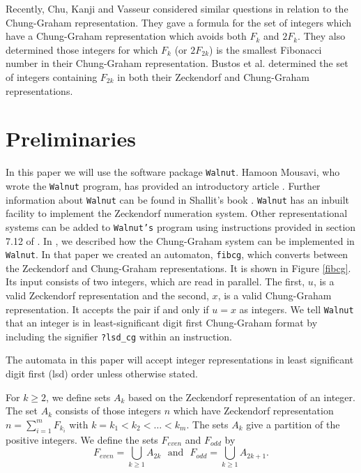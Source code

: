 \documentclass[12pt]{article}
\theoremstyle{plain}
\theoremstyle{case}
\theoremstyle{definition}
\begin{document}
Recently, Chu, Kanji and Vasseur considered similar questions in relation to the Chung-Graham representation.\cite{Chu:2025aa} They gave a formula for the set of integers which have a Chung-Graham representation which avoids both $F_k$ and $2 F_k$. They also determined those integers for which $F_k$ (or $2 F_{2k}$) is the smallest Fibonacci number in their Chung-Graham representation. Bustos et al.\cite{Bustos:2025aa} determined the set of integers containing $F_{2k}$ in both their Zeckendorf and Chung-Graham representations.

\bigskip

\section{Preliminaries}

In this paper we will use the software package {\tt Walnut}. Hamoon Mousavi, who wrote the  {\tt Walnut} program, has provided an introductory article \cite{Mousavi:2016aa}. Further information about {\tt Walnut} can be found in Shallit's book \cite{Shallit:2022}.  {\tt Walnut} has an inbuilt facility to implement the Zeckendorf  numeration system. Other representational systems can be added to  {\tt Walnut's} program using instructions provided in section 7.12 of  \cite{Shallit:2022}. In \cite{Burns:2025aa}, we described how the Chung-Graham system can be implemented in  {\tt Walnut}. In that paper we created an automaton, {\tt fibcg}, which converts between the Zeckendorf and Chung-Graham representations. It is shown in Figure \ref{fibcg}. Its input consists of two integers, which are read in parallel. The first, $u$, is a valid Zeckendorf representation and the second, $x$, is a valid Chung-Graham representation. It accepts the pair if and  only if $u = x$ as integers. We tell {\tt Walnut} that an integer is in least-significant digit first Chung-Graham format by including the signifier  {\tt ?lsd\_cg} within an instruction.

The automata in this paper will accept integer representations in least significant digit first (lsd) order unless otherwise stated. 

For $k \geq 2$, we define sets $A_k$ based on the Zeckendorf representation of an integer. The set $A_k$ consists of those integers $n$ which have Zeckendorf representation $n = \sum_{i = 1}^m F_{k_i}$ with $k = k_1 < k_2 < \dots < k_m$. The sets $A_k$ give a partition of the positive integers. We define the sets $F_{even}$ and $F_{odd}$ by
\begin{equation}
\label{foe}
F_{even} = \bigcup_{k \geq 1} A_{2k}  \,\, \text{  and  } \,\, F_{odd} = \bigcup_{k \geq 1} A_{2k+1}.
\end{equation}
\end{document}
